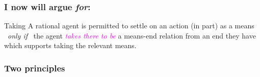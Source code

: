 \documentclass[noamssymb,
graphics,
]{beamer} %
\begin{document}
\begin{frame}
  \frametitle{I now will argue \emph{for}:}

  \begin{block}{Taking}
    A rational agent is permitted to settle on an action (in part) as a means
    \newline
    \mbox{ }\hfill\emph{only if}\hfill\mbox{ }
    \newline
    the agent \textcolor{fuchsia}{\emph{takes there to be}} a means-end relation from an end they have which supports taking the relevant means.
  \end{block}
\end{frame}

\subsubsection{Two principles}
\label{sec:two-principles}
\end{document}
